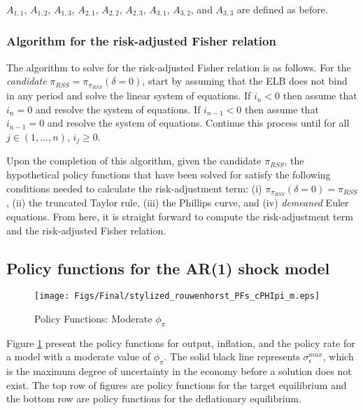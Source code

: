 \documentclass[11pt]{article}
\begin{document}
\begin{singlespace}
		 $A_{1,1}$, $A_{1,2}$, $A_{1,3}$, $A_{2,1}$, $A_{2,2}$, $A_{2,3}$, $A_{3,1}$, $A_{3,2}$, and $A_{3,3}$ are defined as before.
		 
	 	\subsubsection{Algorithm for the risk-adjusted Fisher relation}
	 	The algorithm to solve for the risk-adjusted Fisher relation is as follows. For the \textit{candidate} $\pi_{RSS} = \pi_{\pi_{RSS}}(\delta=0)$, start by assuming that the ELB does not bind in any period and solve the linear system of equations. If $i_n < 0$ then assume that $i_n = 0$ and resolve the system of equations. If $i_{n-1} < 0$ then assume that $i_{n-1} = 0$ and resolve the system of equations. Continue this process until for all $j\in(1,\dots,n)$, $i_j \ge 0$. 
	 	
 		Upon the completion of this algorithm, given the candidate $\pi_{RSS}$, the hypothetical policy functions that have been solved for satisfy the following conditions needed to calculate the risk-adjustment term: (i) $\pi_{\pi_{RSS}}(\delta=0)=\pi_{RSS}$, (ii) the truncated Taylor rule, (iii) the Phillips curve,  and (iv) \textit{demeaned} Euler equations. From here, it is straight forward to compute the risk-adjustment term and the risk-adjusted Fisher relation. 
				
		\subsection{Policy functions for the AR(1) shock model}
		
		\begin{figure}[!ht]
			\begin{center}
				\caption{Policy Functions: Moderate  $\phi_{\pi}$}
				\texttt{[image: Figs/Final/stylized\_rouwenhorst\_PFs\_cPHIpi\_m.eps]}\label{fig:PFsModeratecPHIpi}
			\end{center}
		\end{figure}
		
		Figure \ref{fig:PFsModeratecPHIpi} present the policy functions for output, inflation, and the policy rate for a model with a moderate value of $\phi_{\pi}$. The solid black line represents $\sigma^{max}_{\epsilon}$, which is the maximum degree of uncertainty in the economy before a solution does not exist. The top row of figures are policy functions for the target equilibrium and the bottom row are policy functions for the deflationary equilibrium.
		

\end{singlespace}
\end{document}
